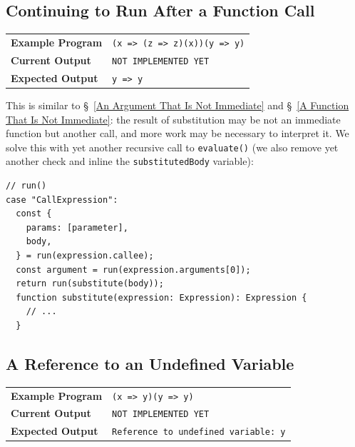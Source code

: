 \documentclass[12pt, oneside]{book}
\begin{document}
\subsection{Continuing to Run After a Function Call}
\label{Continuing to Run After a Function Call}

\begin{center}
\begin{tabular}{ll}
\textbf{Example Program} & \texttt{(x => (z => z)(x))(y => y)} \\
\textbf{Current Output} & \texttt{NOT IMPLEMENTED YET} \\
\textbf{Expected Output} & \texttt{y => y} \\
\end{tabular}
\end{center}

This is similar to §~\ref{An Argument That Is Not Immediate} and §~\ref{A Function That Is Not Immediate}: the result of substitution may be not an immediate function but another call, and more work may be necessary to interpret it. We solve this with yet another recursive call to \texttt{evaluate()} (we also remove yet another check and inline the \texttt{substitutedBody} variable):

\begin{verbatim}
// run()
case "CallExpression":
  const {
    params: [parameter],
    body,
  } = run(expression.callee);
  const argument = run(expression.arguments[0]);
  return run(substitute(body));
  function substitute(expression: Expression): Expression {
    // ...
  }
\end{verbatim}

\subsection{A Reference to an Undefined Variable}

\begin{center}
\begin{tabular}{ll}
\textbf{Example Program} & \texttt{(x => y)(y => y)} \\
\textbf{Current Output} & \texttt{NOT IMPLEMENTED YET} \\
\textbf{Expected Output} & \texttt{Reference to undefined variable: y} \\
\end{tabular}
\end{center}
\end{document}
